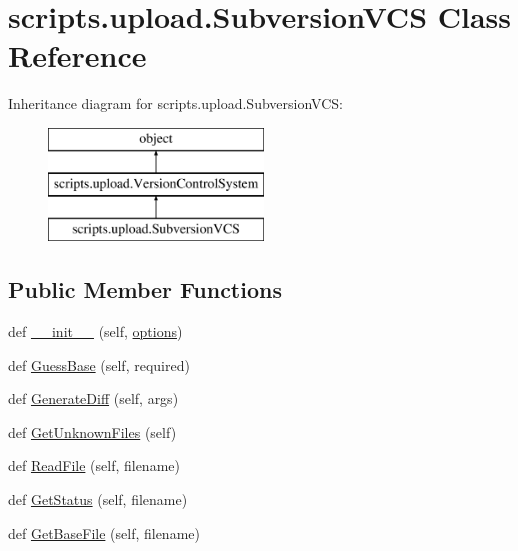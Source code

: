 \hypertarget{classscripts_1_1upload_1_1_subversion_v_c_s}{}\section{scripts.\+upload.\+Subversion\+V\+CS Class Reference}
\label{classscripts_1_1upload_1_1_subversion_v_c_s}
Inheritance diagram for scripts.\+upload.\+Subversion\+V\+CS\+:\begin{figure}[H]
\begin{center}
\leavevmode
\includegraphics[height=3.000000cm]{d4/d89/classscripts_1_1upload_1_1_subversion_v_c_s}
\end{center}
\end{figure}
\subsection*{Public Member Functions}
\begin{DoxyCompactItemize}
\item 
def \mbox{\hyperlink{classscripts_1_1upload_1_1_subversion_v_c_s_a5180e2cfa533732369e497a81f437e8e}{\+\_\+\+\_\+init\+\_\+\+\_\+}} (self, \mbox{\hyperlink{classscripts_1_1upload_1_1_version_control_system_a090853e1034cd5dfe4fd0118201e5af1}{options}})
\item 
def \mbox{\hyperlink{classscripts_1_1upload_1_1_subversion_v_c_s_acde8a0f94bd1f829b7dcddf133c56c39}{Guess\+Base}} (self, required)
\item 
def \mbox{\hyperlink{classscripts_1_1upload_1_1_subversion_v_c_s_a2fc2b2cf2f05b53694a28326338870e5}{Generate\+Diff}} (self, args)
\item 
def \mbox{\hyperlink{classscripts_1_1upload_1_1_subversion_v_c_s_a30d4e7ce889cdfba5af7f43a7fac47f9}{Get\+Unknown\+Files}} (self)
\item 
def \mbox{\hyperlink{classscripts_1_1upload_1_1_subversion_v_c_s_a0e6d9933a9c8dd10e71eb11927ce6a76}{Read\+File}} (self, filename)
\item 
def \mbox{\hyperlink{classscripts_1_1upload_1_1_subversion_v_c_s_a9c261fc41639e3db5a9c8a0d422adf1e}{Get\+Status}} (self, filename)
\item 
def \mbox{\hyperlink{classscripts_1_1upload_1_1_subversion_v_c_s_a8b2d91ae013cd586191a010c16bfa0b8}{Get\+Base\+File}} (self, filename)
\end{DoxyCompactItemize}
